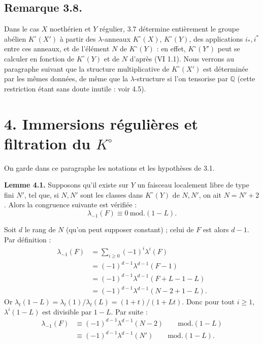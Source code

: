 \subsection*{Remarque 3.8.}

Dans le cas \(X\) noethérien et \(Y\) régulier, 3.7 détermine entièrement le groupe abélien \(K^\circ(X')\) à partir des \(\lambda\)-anneaux \(K^\circ(X)\), \(K^\circ(Y)\), des applications \(i_*,i^*\) entre ces anneaux, et de l'élément \(N\) de \(K^\circ(Y)\) : en effet, \(K^\circ(Y')\) peut se calculer en fonction de \(K^\circ(Y)\) et de \(N\) d'après (VI 1.1). Nous verrons au paragraphe suivant que la structure multiplicative de \(K^\circ(X')\) est déterminée par les mêmes données, de même que la \(\lambda\)-structure si l'on tensorise par \(\mathbb Q\) (cette restriction étant sans doute inutile : voir 4.5).

\section*{4. Immersions régulières et filtration du \(K^\circ\)}

On garde dans ce paragraphe les notations et les hypothèses de 3.1.

\textbf{Lemme 4.1.} Supposons qu'il existe sur \(Y\) un faisceau localement libre de type fini \(N'\), tel que, si \(N,N'\) sont les classes dans \(K^\circ(Y)\) de \(N,N'\), on ait \(N=N'+2\). Alors la congruence suivante est vérifiée :
\[
  \lambda_{-1}(F)\equiv 0 \ \mathrm{mod.}(1-L).
\]

Soit \(d\) le rang de \(N\) (qu'on peut supposer constant) ; celui de \(F\) est alors \(d-1\). Par définition :
\[
\begin{aligned}
\lambda_{-1}(F)
 &= \sum_{i\ge0}(-1)^i\lambda^i(F)\\
 &= (-1)^{d-1}\lambda^{d-1}(F-1)\\
 &= (-1)^{d-1}\lambda^{d-1}(F+L-1-L)\\
 &= (-1)^{d-1}\lambda^{d-1}(N-2+1-L).
\end{aligned}
\]
Or \(\lambda_t(1-L)=\lambda_t(1)/\lambda_t(L)=(1+t)/(1+Lt)\). Donc pour tout \(i\ge1\), \(\lambda^i(1-L)\) est divisible par \(1-L\). Par suite :
\[
\begin{aligned}
\lambda_{-1}(F)
  &\equiv (-1)^{d-1}\lambda^{d-1}(N-2) \qquad\mathrm{mod.}(1-L)\\
  &\equiv(-1)^{d-1}\lambda^{d-1}(N') \qquad\mathrm{mod.}(1-L).
\end{aligned}
\]
